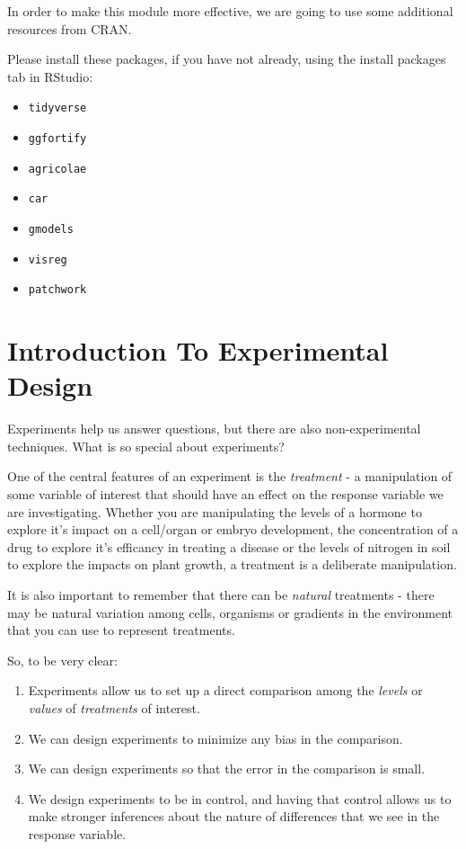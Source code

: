 \documentclass[
]{book}
\providecommand{\tightlist}{%
  \setlength{\itemsep}{0pt}\setlength{\parskip}{0pt}}
\begin{document}
In order to make this module more effective, we are going to use some additional resources from CRAN.

Please install these packages, if you have not already, using the install packages tab in RStudio:

\begin{itemize}
\tightlist
\item
  \texttt{tidyverse}
\item
  \texttt{ggfortify}
\item
  \texttt{agricolae}
\item
  \texttt{car}
\item
  \texttt{gmodels}
\item
  \texttt{visreg}
\item
  \texttt{patchwork}
\end{itemize}

\hypertarget{intro}{%
\chapter{Introduction To Experimental Design}\label{intro}}

Experiments help us answer questions, but there are also non-experimental techniques. What is so special about experiments?

One of the central features of an experiment is the \emph{treatment} - a manipulation of some variable of interest that should have an effect on the response variable we are investigating. Whether you are manipulating the levels of a hormone to explore it's impact on a cell/organ or embryo development, the concentration of a drug to explore it's efficancy in treating a disease or the levels of nitrogen in soil to explore the impacts on plant growth, a treatment is a deliberate manipulation.

It is also important to remember that there can be \emph{natural} treatments - there may be natural variation among cells, organisms or gradients in the environment that you can use to represent treatments.

So, to be very clear:

\begin{enumerate}
\def\labelenumi{\arabic{enumi}.}
\tightlist
\item
  Experiments allow us to set up a direct comparison among the \emph{levels} or \emph{values} of \emph{treatments} of interest.
\item
  We can design experiments to minimize any bias in the comparison.
\item
  We can design experiments so that the error in the comparison is small.
\item
  We design experiments to be in control, and having that control allows us to make stronger inferences about the nature of differences that we see in the response variable.
\end{enumerate}
\end{document}
